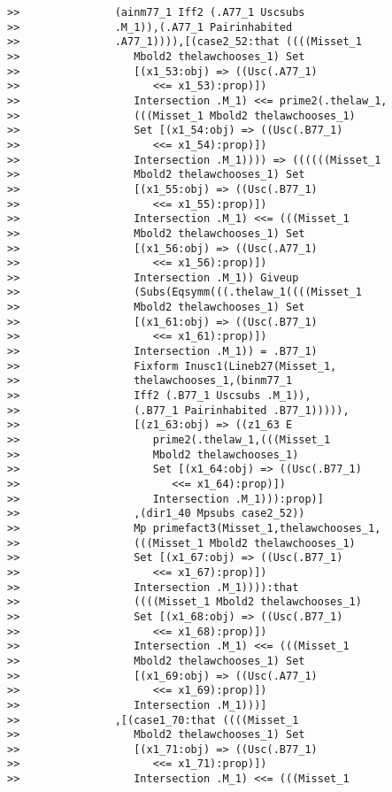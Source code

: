 \documentclass[12pt]{article}
\begin{document}
\begin{verbatim}
>>               (ainm77_1 Iff2 (.A77_1 Uscsubs
>>               .M_1)),(.A77_1 Pairinhabited
>>               .A77_1)))),[(case2_52:that ((((Misset_1
>>                  Mbold2 thelawchooses_1) Set
>>                  [(x1_53:obj) => ((Usc(.A77_1)
>>                     <<= x1_53):prop)])
>>                  Intersection .M_1) <<= prime2(.thelaw_1,
>>                  (((Misset_1 Mbold2 thelawchooses_1)
>>                  Set [(x1_54:obj) => ((Usc(.B77_1)
>>                     <<= x1_54):prop)])
>>                  Intersection .M_1)))) => ((((((Misset_1
>>                  Mbold2 thelawchooses_1) Set
>>                  [(x1_55:obj) => ((Usc(.B77_1)
>>                     <<= x1_55):prop)])
>>                  Intersection .M_1) <<= (((Misset_1
>>                  Mbold2 thelawchooses_1) Set
>>                  [(x1_56:obj) => ((Usc(.A77_1)
>>                     <<= x1_56):prop)])
>>                  Intersection .M_1)) Giveup
>>                  (Subs(Eqsymm(((.thelaw_1((((Misset_1
>>                  Mbold2 thelawchooses_1) Set
>>                  [(x1_61:obj) => ((Usc(.B77_1)
>>                     <<= x1_61):prop)])
>>                  Intersection .M_1)) = .B77_1)
>>                  Fixform Inusc1(Lineb27(Misset_1,
>>                  thelawchooses_1,(binm77_1
>>                  Iff2 (.B77_1 Uscsubs .M_1)),
>>                  (.B77_1 Pairinhabited .B77_1))))),
>>                  [(z1_63:obj) => ((z1_63 E
>>                     prime2(.thelaw_1,(((Misset_1
>>                     Mbold2 thelawchooses_1)
>>                     Set [(x1_64:obj) => ((Usc(.B77_1)
>>                        <<= x1_64):prop)])
>>                     Intersection .M_1))):prop)]
>>                  ,(dir1_40 Mpsubs case2_52))
>>                  Mp primefact3(Misset_1,thelawchooses_1,
>>                  (((Misset_1 Mbold2 thelawchooses_1)
>>                  Set [(x1_67:obj) => ((Usc(.B77_1)
>>                     <<= x1_67):prop)])
>>                  Intersection .M_1)))):that
>>                  ((((Misset_1 Mbold2 thelawchooses_1)
>>                  Set [(x1_68:obj) => ((Usc(.B77_1)
>>                     <<= x1_68):prop)])
>>                  Intersection .M_1) <<= (((Misset_1
>>                  Mbold2 thelawchooses_1) Set
>>                  [(x1_69:obj) => ((Usc(.A77_1)
>>                     <<= x1_69):prop)])
>>                  Intersection .M_1)))]
>>               ,[(case1_70:that ((((Misset_1
>>                  Mbold2 thelawchooses_1) Set
>>                  [(x1_71:obj) => ((Usc(.B77_1)
>>                     <<= x1_71):prop)])
>>                  Intersection .M_1) <<= (((Misset_1

\end{verbatim}
\end{document}
